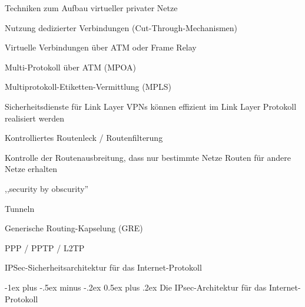 \documentclass[a4paper]{article}
\makeatletter
\renewcommand{\section}{\@startsection{section}{1}{0mm}%
 {-1ex plus -.5ex minus -.2ex}%
 {0.5ex plus .2ex}%
 {\normalfont\large\bfseries}}
\makeatother
\begin{document}
\begin{multicols}{3}
      Techniken zum Aufbau virtueller privater Netze
      \begin{itemize*}
            \item Nutzung dedizierter Verbindungen (Cut-Through-Mechanismen)
            \begin{itemize*}
                  \item Virtuelle Verbindungen über ATM oder Frame Relay
                  \item Multi-Protokoll über ATM (MPOA)
                  \item Multiprotokoll-Etiketten-Vermittlung (MPLS)
                  \item Sicherheitsdienste für Link Layer VPNs können effizient im Link Layer Protokoll realisiert werden
            \end{itemize*}
            \item Kontrolliertes Routenleck / Routenfilterung
            \begin{itemize*}
                  \item Kontrolle der Routenausbreitung, dass nur bestimmte Netze Routen für andere Netze erhalten
                  \item ,,security by obscurity'' %
            \end{itemize*}
            \item Tunneln
            \begin{itemize*}
                  \item Generische Routing-Kapselung (GRE)
                  \item PPP / PPTP / L2TP
                  \item IPSec-Sicherheitsarchitektur für das Internet-Protokoll
            \end{itemize*}
      \end{itemize*}
      \columnbreak

      \section{Die IPsec-Architektur für das Internet-Protokoll}

\end{multicols}
\end{document}
